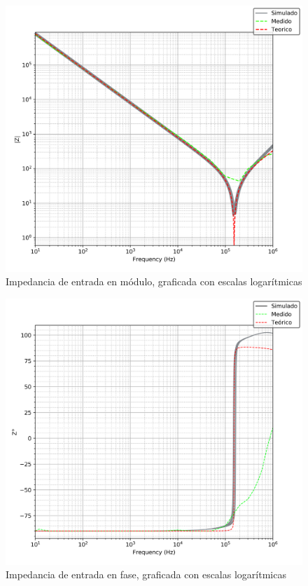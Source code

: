 \begin{figure}[H]
	\centering
	\includegraphics[scale=0.7]{Recursos/Derivador/impedancia_modulo.png}
	\caption{Impedancia de entrada en m\'odulo, graficada con escalas logar\'itmicas}
	\label{fig:derivador_impedancia_modulo}
\end{figure}

\begin{figure}[H]
	\centering
	\includegraphics[scale=0.7]{Recursos/Derivador/impedancia_fase.png}
	\caption{Impedancia de entrada en fase, graficada con escalas logar\'itmicas}
	\label{fig:derivador_impedancia_fase}
\end{figure}

